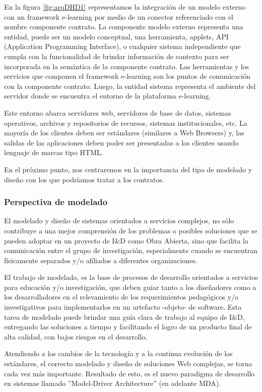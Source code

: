 En la figura \ref{fig:arqDHD1} representamos la integración de un modelo externo con
un framework e-learning por medio de un conector referenciado con el nombre
componente contrato. La componente modelo externo representa una entidad, puede ser un modelo
conceptual, una herramienta, applets, API (Application Programming Interface), o
cualquier sistema independiente que cumpla con la funcionalidad de brindar
información de contexto para ser incorporada en la semántica de la componente
contrato. Las herramientas y los servicios que componen el framework e-learning son
los puntos de comunicación con la componente contrato. Luego, la entidad sistema
representa el ambiente del servidor donde se encuentra el entorno de
la plataforma e-learning.

Este entorno abarca servidores web, servidores de base de datos, sistemas
operativos, archivos y repositorios de recursos, sistemas institucionales, etc.
La mayoría de los clientes deben ser estándares (similares a Web Browsers) y,
las salidas de las aplicaciones deben poder ser presentadas a los clientes
usando lenguaje de marcas tipo HTML.

En el próximo punto, nos centraremos en la importancia del tipo de modelado y
diseño con los que podríamos tratar a los contratos.


\subsubsection{Perspectiva de modelado}

 
El modelado y diseño de sistemas orientados a servicios complejos, no sólo
contribuye a una mejor comprensión de los problemas o posibles soluciones que se
pueden adoptar en un proyecto de I\&D como Obra Abierta, sino que facilita la
comunicación entre el grupo de investigación, especialmente cuando se encuentran
físicamente separados y/o afiliados a diferentes organizaciones.

El trabajo de modelado, es la base de procesos de desarrollo orientados a
servicios para educación y/o investigación, que deben guiar tanto a los
diseñadores como a los desarrolladores en el relevamiento de los requerimientos
pedagógicos y/o investigativos para implementarlos en un artefacto  -objeto- de
software. Esta tarea de modelado puede brindar una guía clara de trabajo al
equipo de I\&D, entregando las soluciones a tiempo y facilitando el logro de un
producto final de alta calidad, con bajos riesgos en el desarrollo.

Atendiendo a los cambios de la tecnología y a la continua evolución de
los estándares, el correcto modelado y diseño de soluciones Web complejas, se
torna cada vez más importante. Resultado de esto, es el nuevo paradigma
de desarrollo en sistemas llamado ”Model-Driver Architecture” (en adelante MDA).

